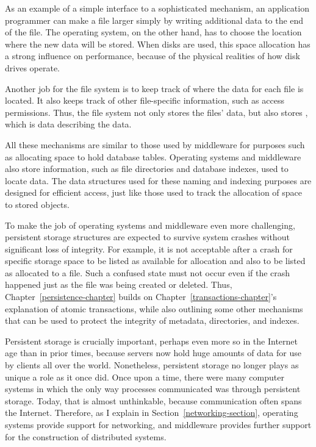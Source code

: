 As an example of a simple interface to a sophisticated mechanism, an application programmer can make a file larger simply
by writing additional data to the end of the file.  The operating
system, on the other hand, has to choose the location where
the new data will be stored.  When disks are used, this space allocation has a strong
influence on performance, because of the physical realities of how
disk drives operate.

Another job for the file system is to keep track of where the data for
each file is located.  It also keeps track of other file-specific information, such as access permissions.  Thus, the file system not only
stores the files' data, but also stores ,
which is data describing the data.

All these mechanisms are similar to those used by middleware for
purposes such as allocating space to hold database tables.  Operating
systems and middleware also store information,
such as file directories and database indexes, used to locate data.  The data structures
used for these naming and indexing purposes are designed for efficient
access, just like those used to track the allocation of space to
stored objects.

To make the job of operating systems and middleware even more
challenging, persistent storage structures are expected to survive
system crashes without significant loss of integrity.  For example,
it is not acceptable after a crash for specific storage space to be listed as
available for allocation and also to be listed as allocated to a file.
Such a confused state must not occur even if the crash happened just as the file was being
created or deleted.  Thus, Chapter~\ref{persistence-chapter} builds on
Chapter~\ref{transactions-chapter}'s explanation of atomic
transactions, while also outlining some other mechanisms that can be
used to protect the integrity of metadata, directories, and indexes.

Persistent storage is crucially important, perhaps even more so in the
Internet age than in prior times, because servers now hold huge
amounts of data for use by clients all over the world.  Nonetheless,
persistent storage no longer plays as unique a role as it once did.
Once upon a time, there were many computer systems in which the only
way processes communicated was through persistent storage.  Today,
that is almost unthinkable, because communication often spans the
Internet.  Therefore, as I explain in
Section~\ref{networking-section}, operating systems provide support
for networking, and middleware provides further support for the
construction of distributed systems.

